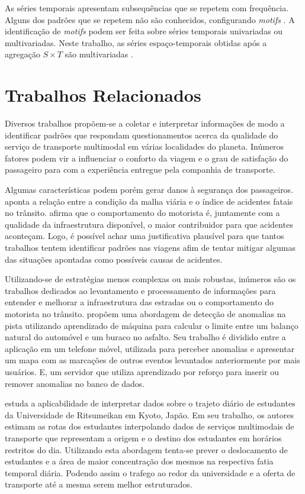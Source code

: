 \documentclass[12pt]{report} %
\begin{document}
As séries temporais apresentam subsequências que se repetem com frequência. Alguns dos padrões que se repetem não são conhecidos, configurando \emph{motifs} \citep{esling2012time}. A identificação de \emph{motifs} podem ser feita sobre séries temporais univariadas ou multivariadas. Neste trabalho, as séries espaço-temporais obtidas após a agregação \emph{$S \times T$} são multivariadas \citep{wang2016effective} \citep{vahdatpour2009toward}. 


\chapter{Trabalhos Relacionados}
\label{sec:trabalhos_relacionados}
Diversos trabalhos propõem-se a coletar e interpretar informações de modo a identificar padrões que respondam questionamentos acerca da qualidade do serviço de transporte multimodal em várias localidades do planeta. Inúmeros fatores podem vir a influenciar o conforto da viagem e o grau de satisfação do passageiro para com a experiência entregue pela companhia de transporte. 

Algumas características podem porém gerar danos à segurança dos passageiros. \citep{world2015global} aponta a relação entre a condição da malha viária e o índice de acidentes fatais no trânsito. \citep{euPolicyDep} afirma que o comportamento do motorista é, juntamente com a qualidade da infraestrutura disponível, o maior contribuidor para que acidentes aconteçam. Logo, é possível achar uma justificativa plausível para que tantos trabalhos tentem identificar padrões nas viagens afim de tentar mitigar algumas das situações apontadas como possíveis causas de acidentes.

Utilizando-se de estratégias menos complexas ou mais robustas, inúmeros são os trabalhos dedicados ao levantamento e processamento de informações para entender e melhorar a infraestrutura das estradas ou o comportamento do motorista no trânsito. \citep{gawad2016dynamic} propõem uma abordagem de detecção de anomalias na pista utilizando aprendizado de máquina para calcular o limite entre um balanço natural do automóvel e um buraco no asfalto. Seu trabalho é dividido entre a aplicação em um telefone móvel, utilizada para perceber anomalias e apresentar um mapa com as marcações de outros eventos levantados anteriormente por mais usuários. E, um servidor que utiliza aprendizado por reforço para inserir ou remover anomalias no banco de dados. 

\citep{HANAOKA2014274} estuda a aplicabilidade de interpretar dados sobre o trajeto diário de estudantes da Universidade de Ritsumeikan em Kyoto, Japão. Em seu trabalho, os autores estimam as rotas dos estudantes interpolando dados de serviços multimodais de transporte que representam a origem e o destino dos estudantes em horários restritos do dia. Utilizando esta abordagem tenta-se prever o deslocamento de estudantes e a área de maior concentração dos mesmos na respectiva fatia temporal diária. Podendo assim o trafego ao redor da universidade e a oferta de transporte até a mesma serem melhor estruturados.
\end{document}
